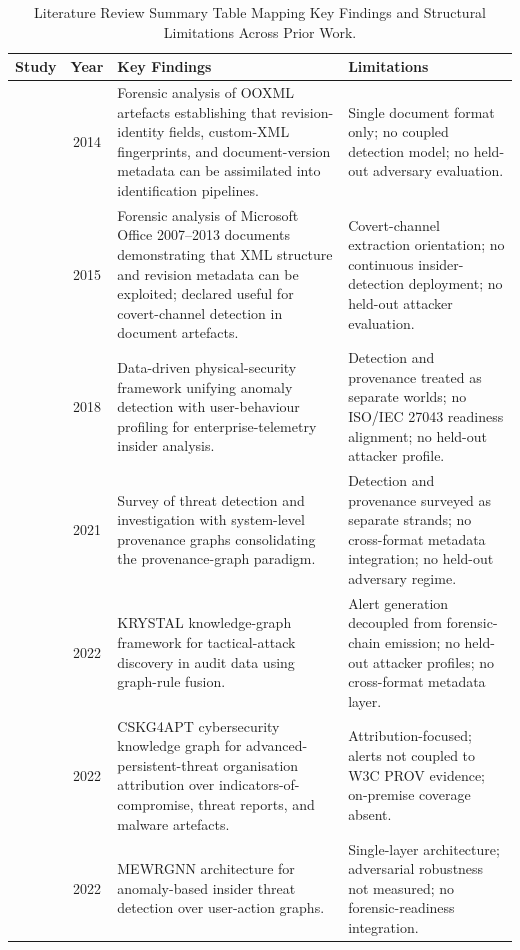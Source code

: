 \begin{table}[t!]
\caption{Literature Review Summary Table Mapping Key Findings and Structural Limitations Across Prior Work.}
\label{tab:lit_review_summary}
\centering
\footnotesize
\renewcommand{\arraystretch}{1.55}
\setlength{\tabcolsep}{5pt}
\begin{tabularx}{\textwidth}{l c X X}
\toprule
\textbf{Study} & \textbf{Year} & \textbf{Key Findings} & \textbf{Limitations} \\
\midrule
\citet{didriksen2014ooxml} & 2014 & Forensic analysis of OOXML artefacts establishing that revision-identity fields, custom-XML fingerprints, and document-version metadata can be assimilated into identification pipelines. & Single document format only; no coupled detection model; no held-out adversary evaluation. \\
\citet{fu2015docx} & 2015 & Forensic analysis of Microsoft Office 2007--2013 documents demonstrating that XML structure and revision metadata can be exploited; declared useful for covert-channel detection in document artefacts. & Covert-channel extraction orientation; no continuous insider-detection deployment; no held-out attacker evaluation. \\
\citet{mavroeidis2018framework} & 2018 & Data-driven physical-security framework unifying anomaly detection with user-behaviour profiling for enterprise-telemetry insider analysis. & Detection and provenance treated as separate worlds; no ISO/IEC 27043 readiness alignment; no held-out attacker profile. \\
\citet{li2021threat} & 2021 & Survey of threat detection and investigation with system-level provenance graphs consolidating the provenance-graph paradigm. & Detection and provenance surveyed as separate strands; no cross-format metadata integration; no held-out adversary regime. \\
\citet{kurniawan2022krystal} & 2022 & KRYSTAL knowledge-graph framework for tactical-attack discovery in audit data using graph-rule fusion. & Alert generation decoupled from forensic-chain emission; no held-out attacker profiles; no cross-format metadata layer. \\
\citet{ren2022cskg4apt} & 2022 & CSKG4APT cybersecurity knowledge graph for advanced-persistent-threat organisation attribution over indicators-of-compromise, threat reports, and malware artefacts. & Attribution-focused; alerts not coupled to W3C PROV evidence; on-premise coverage absent. \\
\citet{xiao2022robust} & 2022 & MEWRGNN architecture for anomaly-based insider threat detection over user-action graphs. & Single-layer architecture; adversarial robustness not measured; no forensic-readiness integration. \\

\end{tabularx}
\end{table}
